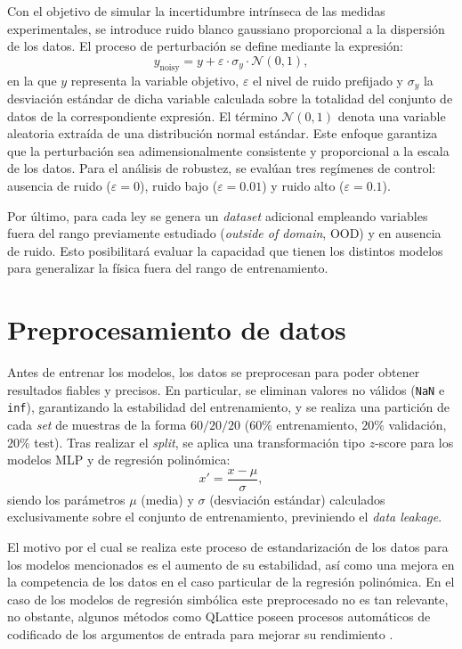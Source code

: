 \documentclass[11pt, a4paper]{article}
\begin{document}
Con el objetivo de simular la incertidumbre intrínseca de las medidas experimentales, se introduce ruido blanco gaussiano proporcional a la dispersión de los datos. El proceso de perturbación se define mediante la expresión:
\begin{equation}
    y_{\text{noisy}} = y + \varepsilon \cdot \sigma_y \cdot \mathcal{N}(0, 1),
\end{equation}
en la que $y$ representa la variable objetivo, $\varepsilon$ el nivel de ruido prefijado y $\sigma_y$ la desviación estándar de dicha variable calculada sobre la totalidad del conjunto de datos de la correspondiente expresión. El término $\mathcal{N}(0, 1)$ denota una variable aleatoria extraída de una distribución normal estándar. Este enfoque garantiza que la perturbación sea adimensionalmente consistente y proporcional a la escala de los datos. Para el análisis de robustez, se evalúan tres regímenes de control: ausencia de ruido ($\varepsilon = 0$), ruido bajo ($\varepsilon = 0.01$) y ruido alto ($\varepsilon = 0.1$).

Por último, para cada ley se genera un \textit{dataset} adicional empleando variables fuera del rango previamente estudiado (\textit{outside of domain}, OOD) y en ausencia de ruido. Esto posibilitará evaluar la capacidad que tienen los distintos modelos para generalizar la física fuera del rango de entrenamiento.


\section{Preprocesamiento de datos}

Antes de entrenar los modelos, los datos se preprocesan para poder obtener resultados fiables y precisos. En particular, se eliminan valores no válidos (\texttt{NaN} e \texttt{inf}), garantizando la estabilidad del entrenamiento, y se realiza una partición de cada \textit{set} de muestras de la forma $60/20/20$ ($60\%$ entrenamiento, $20\%$ validación, $20\%$ test). Tras realizar el \textit{split}, se aplica una transformación tipo $z$-score para los modelos MLP y de regresión polinómica:
\begin{equation}
x' = \frac{x - \mu}{\sigma},
\end{equation} 
siendo los parámetros $\mu$ (media) y $\sigma$ (desviación estándar) calculados exclusivamente sobre el conjunto de entrenamiento, previniendo el \textit{data leakage}.


El motivo por el cual se realiza este proceso de estandarización de los datos para los modelos mencionados es el aumento de su estabilidad, así como una mejora en la competencia de los datos en el caso particular de la regresión polinómica. En el caso de los modelos de regresión simbólica este preprocesado no es tan relevante, no obstante, algunos métodos como QLattice poseen procesos automáticos de codificado de los argumentos de entrada para mejorar su rendimiento \cite{brolos2021feyn}.
\end{document}
